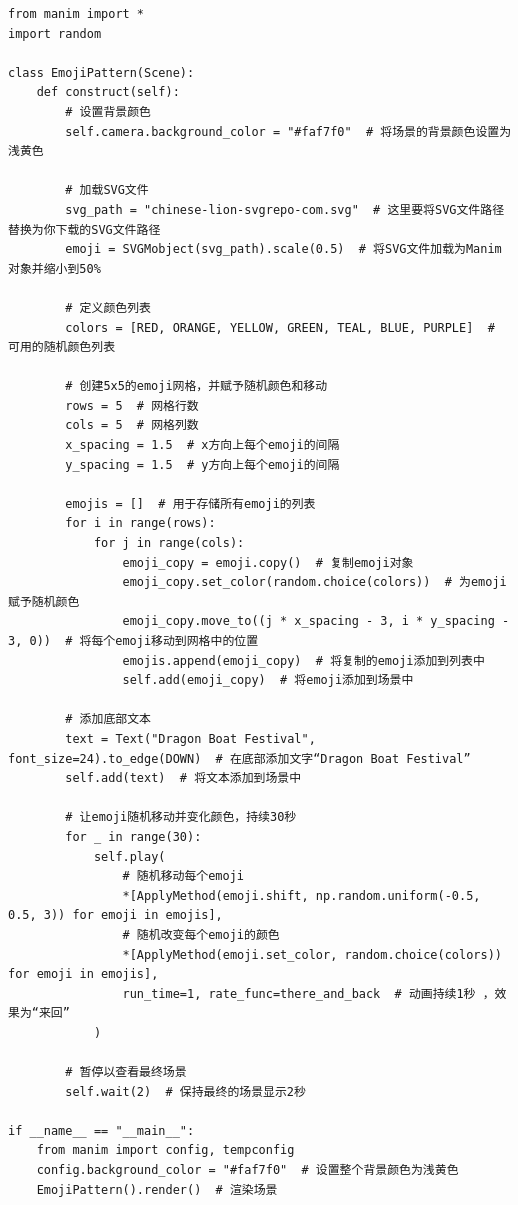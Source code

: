 \begin{lstlisting}[style=pythonstyle]
from manim import *
import random

class EmojiPattern(Scene):
    def construct(self):
        # 设置背景颜色
        self.camera.background_color = "#faf7f0"  # 将场景的背景颜色设置为浅黄色

        # 加载SVG文件
        svg_path = "chinese-lion-svgrepo-com.svg"  # 这里要将SVG文件路径替换为你下载的SVG文件路径
        emoji = SVGMobject(svg_path).scale(0.5)  # 将SVG文件加载为Manim对象并缩小到50%

        # 定义颜色列表
        colors = [RED, ORANGE, YELLOW, GREEN, TEAL, BLUE, PURPLE]  # 可用的随机颜色列表

        # 创建5x5的emoji网格，并赋予随机颜色和移动
        rows = 5  # 网格行数
        cols = 5  # 网格列数
        x_spacing = 1.5  # x方向上每个emoji的间隔
        y_spacing = 1.5  # y方向上每个emoji的间隔

        emojis = []  # 用于存储所有emoji的列表
        for i in range(rows):
            for j in range(cols):
                emoji_copy = emoji.copy()  # 复制emoji对象
                emoji_copy.set_color(random.choice(colors))  # 为emoji赋予随机颜色
                emoji_copy.move_to((j * x_spacing - 3, i * y_spacing - 3, 0))  # 将每个emoji移动到网格中的位置
                emojis.append(emoji_copy)  # 将复制的emoji添加到列表中
                self.add(emoji_copy)  # 将emoji添加到场景中

        # 添加底部文本
        text = Text("Dragon Boat Festival", font_size=24).to_edge(DOWN)  # 在底部添加文字“Dragon Boat Festival”
        self.add(text)  # 将文本添加到场景中

        # 让emoji随机移动并变化颜色，持续30秒
        for _ in range(30):
            self.play(
                # 随机移动每个emoji
                *[ApplyMethod(emoji.shift, np.random.uniform(-0.5, 0.5, 3)) for emoji in emojis],
                # 随机改变每个emoji的颜色
                *[ApplyMethod(emoji.set_color, random.choice(colors)) for emoji in emojis],
                run_time=1, rate_func=there_and_back  # 动画持续1秒 ，效果为“来回”
            )

        # 暂停以查看最终场景
        self.wait(2)  # 保持最终的场景显示2秒

if __name__ == "__main__":
    from manim import config, tempconfig
    config.background_color = "#faf7f0"  # 设置整个背景颜色为浅黄色
    EmojiPattern().render()  # 渲染场景
\end{lstlisting}    


